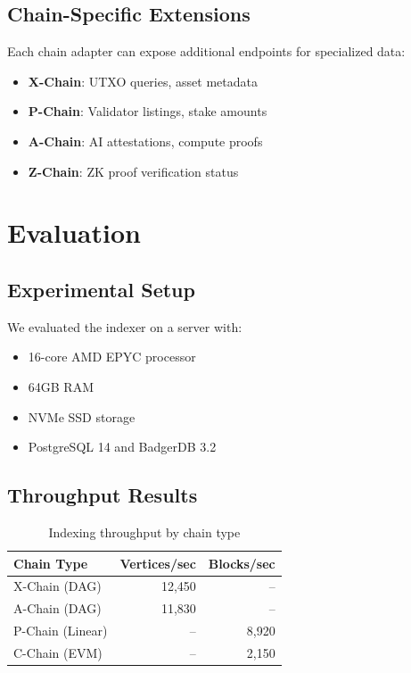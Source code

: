 \documentclass[11pt,twocolumn]{article}
\begin{document}
\subsection{Chain-Specific Extensions}

Each chain adapter can expose additional endpoints for specialized data:

\begin{itemize}
\item \textbf{X-Chain}: UTXO queries, asset metadata
\item \textbf{P-Chain}: Validator listings, stake amounts
\item \textbf{A-Chain}: AI attestations, compute proofs
\item \textbf{Z-Chain}: ZK proof verification status
\end{itemize}

\section{Evaluation}

\subsection{Experimental Setup}

We evaluated the indexer on a server with:
\begin{itemize}
\item 16-core AMD EPYC processor
\item 64GB RAM
\item NVMe SSD storage
\item PostgreSQL 14 and BadgerDB 3.2
\end{itemize}

\subsection{Throughput Results}

\begin{table}[h]
\centering
\caption{Indexing throughput by chain type}
\begin{tabular}{@{}lrr@{}}
\toprule
Chain Type & Vertices/sec & Blocks/sec \\
\midrule
X-Chain (DAG) & 12,450 & -- \\
A-Chain (DAG) & 11,830 & -- \\
P-Chain (Linear) & -- & 8,920 \\
C-Chain (EVM) & -- & 2,150 \\
\bottomrule
\end{tabular}
\label{tab:throughput}
\end{table}
\end{document}
